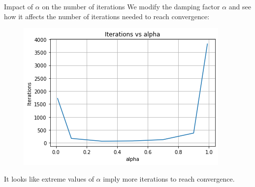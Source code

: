 \documentclass[10pt]{beamer}
\begin{document}
\begin{frame}{Impact of $\alpha$ on the number of iterations}
We modify the damping factor $\alpha$ and see how it affects the number of iterations needed to reach convergence:

\begin{center}
\begin{figure}[h] 
\centering 
\includegraphics[scale=0.65]{it_vs_alpha}
\end{figure}
\end{center}
It looks like extreme values of $\alpha$ imply more iterations to reach convergence.

\end{frame}



 
\end{document}

